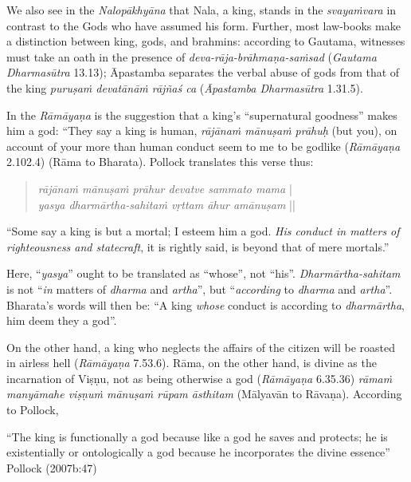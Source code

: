 We also see in the {\sl Nalopākhyāna} that Nala, a king, stands in the {\sl svayaṁvara} in contrast to the Gods who have assumed his form. Further, most law-books make a distinction between king, gods, and brahmins: according to Gautama, witnesses must take an oath in the presence of {\sl deva-rāja-brāhmaṇa-saṁsad} ({\sl Gautama Dharmasūtra} 13.13); Āpastamba separates the verbal abuse of gods from that of the king {\sl puruṣaṁ devatānāṁ rājñaś ca} ({\sl Āpastamba Dharmasūtra} 1.31.5). 

In the {\sl Rāmāyaṇa} is the suggestion that a king’s “supernatural goodness” makes him a god: “They say a king is human, {\sl rājānaṁ mānuṣaṁ prāhuḥ} (but you), on account of your more than human conduct seem to me to be godlike ({\sl Rāmāyaṇa} 2.102.4) (Rāma to Bharata). Pollock translates this verse thus:  
\begin{quote}
{{\sl rājānaṁ mānuṣaṁ prāhur devatve sammato mama}} |\\
{\sl yasya dharmārtha-sahitaṁ vṛttam āhur amānuṣam} || 
\end{quote}

\begin{myquote}
“Some say a king is but a mortal; I esteem him a god. {\sl His conduct in matters of righteousness and statecraft}, it is rightly said, is beyond that of mere mortals.” 
\end{myquote}

Here, “{\sl yasya}” ought to be translated as “whose”, not “his”. {\sl Dharmārtha-sahitam} is not “{\sl in} matters of {\sl dharma} and {\sl artha}'', but ``{\sl according} to {\sl dharma} and {\sl artha}''. Bharata’s words will then be: “A king {\sl whose} conduct is according to {\sl dharmārtha}, him deem they a god”. 

On the other hand, a king who neglects the affairs of the citizen will be roasted in airless hell ({\sl Rāmāyaṇa} 7.53.6). Rāma, on the other hand, is divine as the incarnation of Viṣṇu, not as being otherwise a god ({\sl Rāmāyaṇa} 6.35.36) {\sl rāmaṁ manyāmahe viṣṇuṁ mānuṣaṁ rūpam āsthitam} (Mālyavān to Rāvaṇa). According to Pollock, 

\begin{myquote}
“The king is functionally a god because like a god he saves and protects; he is existentially or ontologically a god because he incorporates the divine essence”
\hfill Pollock (2007b:47)
\end{myquote}

